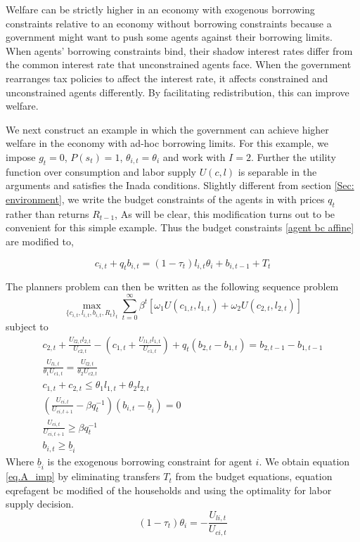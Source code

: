 \documentclass[thmsb,11pt]{article}
\begin{document}
Welfare can  be strictly higher in an economy  with exogenous
borrowing constraints  relative to an economy without borrowing constraints because  a government might want to
push some agents against their borrowing limits. When agents' borrowing
constraints bind, their shadow interest rates differ from the
common interest rate that unconstrained agents face. When the government rearranges tax
policies to  affect the  interest rate, it affects constrained and unconstrained agents
 differently.  By facilitating
redistribution, this can improve welfare. %

We next construct an example in which the government can achieve
higher welfare in the economy with ad-hoc borrowing limits. For this example, we impose $g_t=0$, $P(s_t)=1$, $\theta_{i,t}=\theta_i$ and work with $I=2$.  Further the utility function over consumption and labor supply $U(c,l)$ is separable in the arguments and satisfies the Inada conditions. Slightly different from section \ref{Sec: environment}, we write the budget constraints of the agents in with prices $q_t$ rather than returns $R_{t-1}$, As will be clear, this modification turns out to be convenient for this simple example. Thus the budget constraints \ref{agent bc affine} are modified to,

\begin{equation}
\label{agent bc modified}
c_{i,t}+q_tb_{i,t}=(1-\tau_t)l_{i,t}\theta_{i}+b_{i,t-1}+T_t
\end{equation}


The  planners problem can then be written as the following sequence problem
\begin{equation}
	\max_{\{c_{i,t},l_{i,t},b_{i,t},R_t\}_t} \sum_{t=0}^\infty\beta^t\left[\omega_1U(c_{1,t},l_{1,t}) +\omega_2 U(c_{2,t},l_{2,t})\right]\label{eq.A_obj}
\end{equation}subject to
\begin{subequations}
\begin{align}
	c_{2,t}+\frac{U_{l2,t}l_{2,t}}{U_{c2,t}}-\left(c_{1,t}+\frac{U_{l1,t}l_{1,t}}{U_{c1,t}}\right) +q_t\left( b_{2,t}-b_{1,t}\right)  = b_{2,t-1}-b_{1,t-1}\label{eq.A_imp}\\
	\frac{U_{l1,t}}{\theta_1U_{c1,t}} = \frac{U_{l2,t}}{\theta_2 U_{c2,t}}\label{eq.A_wage}\\
	c_{1,t}+c_{2,t} \leq \theta_1 l_{1,t}+\theta_2 l_{2,t}\label{eq.A_feas}\\
	\left(\frac{U_{ci,t}}{U_{ci,t+1}}-\beta q^{-1}_t\right)(b_{i,t}-\underline b_i) = 0\label{eq.A_slack}\\
	\frac{U_{ci,t}}{U_{ci,t+1}} \geq \beta q_t^{-1}\label{eq.A_euler}\\
	b_{i,t}\geq \underline b_i
\end{align}
\end{subequations}  Where $\underline b_i$ is the exogenous borrowing constraint for agent $i$.  We obtain equation \eqref{eq.A_imp} by eliminating transfers $T_t$ from the budget equations, equation eqref{agent bc modified} of the households and using the optimality for labor supply decision. 
\[(1-\tau_t)\theta_i=-\frac{U_{li,t}}{U_{ci,t}}\]
\end{document}
